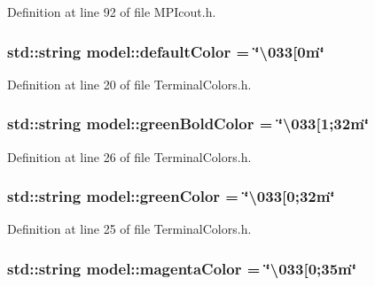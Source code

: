 Definition at line 92 of file M\+P\+Icout.\+h.

\hypertarget{namespacemodel_ad88eee7a3e334a4d2f9f676d077527b6}{}
\subsubsection[{default\+Color}]{\setlength{\rightskip}{0pt plus 5cm}std\+::string model\+::default\+Color = \char`\"{}\textbackslash{}033\mbox{[}0m\char`\"{}}\label{namespacemodel_ad88eee7a3e334a4d2f9f676d077527b6}


Definition at line 20 of file Terminal\+Colors.\+h.

\hypertarget{namespacemodel_ac930beb7c72e614bae7e16edd2a1738a}{}
\subsubsection[{green\+Bold\+Color}]{\setlength{\rightskip}{0pt plus 5cm}std\+::string model\+::green\+Bold\+Color = \char`\"{}\textbackslash{}033\mbox{[}1;32m\char`\"{}}\label{namespacemodel_ac930beb7c72e614bae7e16edd2a1738a}


Definition at line 26 of file Terminal\+Colors.\+h.

\hypertarget{namespacemodel_abb69004d56ef9c3108f1bda2bb914ae9}{}
\subsubsection[{green\+Color}]{\setlength{\rightskip}{0pt plus 5cm}std\+::string model\+::green\+Color = \char`\"{}\textbackslash{}033\mbox{[}0;32m\char`\"{}}\label{namespacemodel_abb69004d56ef9c3108f1bda2bb914ae9}


Definition at line 25 of file Terminal\+Colors.\+h.

\hypertarget{namespacemodel_a541f216e01462d19014e8782acb152cb}{}
\subsubsection[{magenta\+Color}]{\setlength{\rightskip}{0pt plus 5cm}std\+::string model\+::magenta\+Color = \char`\"{}\textbackslash{}033\mbox{[}0;35m\char`\"{}}\label{namespacemodel_a541f216e01462d19014e8782acb152cb}


